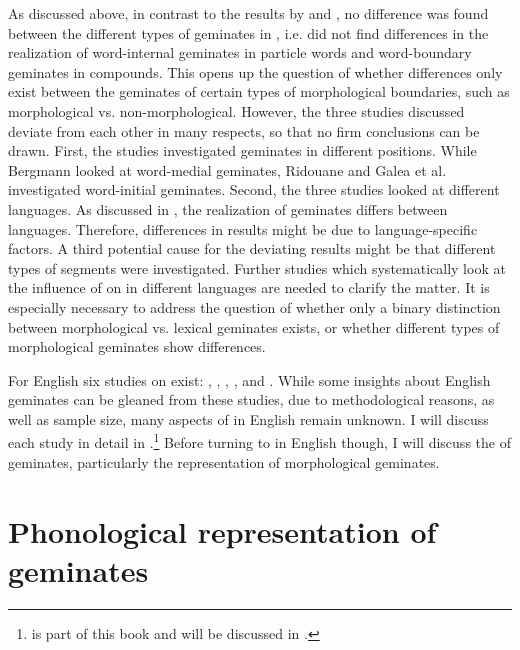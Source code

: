 As discussed above, in contrast to the results by \cite{Ridouane.2010} and \cite{Galea.2014}, no difference was found between the different types of geminates in \cite{Bergmann.2017}, i.e. \cite{Bergmann.2017} did not find differences in the realization of word-internal geminates in particle words and word-boundary geminates in compounds. This opens up the question of whether differences only exist between the geminates of certain types of morphological boundaries, such as morphological vs. non-morphological. However, the three studies discussed deviate from each other in many respects, so that no firm conclusions can be drawn. First, the studies investigated geminates in different positions. While Bergmann looked at word-medial geminates, Ridouane and Galea et al. investigated word-initial geminates. Second, the three studies looked at different languages. As discussed in , the realization of geminates differs between languages. Therefore, differences in results might be due to language-specific factors. A third potential cause for the deviating results might be that different types of segments were investigated. Further studies which systematically look at the influence of  on  in different languages are needed to clarify the matter. It is especially necessary to address the question of whether only a binary distinction between morphological vs.  lexical geminates exists, or whether different types of  morphological geminates show differences.


For English six studies on  exist: \cite{Delattre.}, \citet{Kaye.2005}, \citet{Oh.2012}, \cite{Oh.2013}, \cite{Kotzor.2016} and \cite{BenHedia.2017}. While some insights about English geminates can be gleaned from these studies, due to methodological reasons, as well as sample size, many aspects of  in English remain unknown. I will discuss each study in detail in .\footnote{\cite{BenHedia.2017} is part of this book and will be discussed in .} Before turning to  in English though, I will discuss the  of geminates, particularly the representation of  morphological geminates.



\section{Phonological representation of geminates } \label{Phonological representation of geminates}

